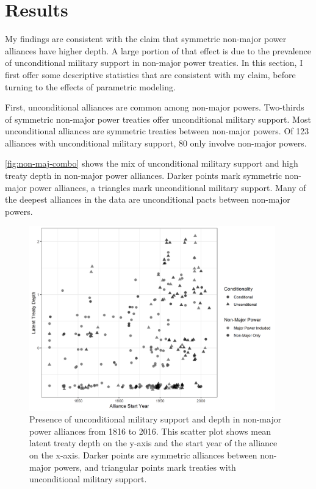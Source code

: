 \documentclass[12pt]{article}
\begin{document}
\section{Results}

My findings are consistent with the claim that symmetric non-major power alliances have higher depth. 
A large portion of that effect is due to the prevalence of unconditional military support in non-major power treaties. 
In this section, I first offer some descriptive statistics that are consistent with my claim, before turning to the effects of parametric modeling. 


First, unconditional alliances are common among non-major powers. 
Two-thirds of symmetric non-major power treaties offer unconditional military support. 
Most unconditional alliances are symmetric treaties between non-major powers. 
Of 123 alliances with unconditional military support, 80 only involve non-major powers. 


\autoref{fig:non-maj-combo} shows the mix of unconditional military support and high treaty depth in non-major power alliances. 
Darker points mark symmetric non-major power alliances, a triangles mark unconditional military support. 
Many of the deepest alliances in the data are unconditional pacts between non-major powers. 

\begin{figure}[hbtp]
\centering
\includegraphics[width=0.95\textwidth]{../figures/non-maj-combo.png}
\caption{Presence of unconditional military support and depth in non-major power alliances from 1816 to 2016. This scatter plot shows mean latent treaty depth on the y-axis and the start year of the alliance on the x-axis. Darker points are symmetric alliances between non-major powers, and triangular points mark treaties with unconditional military support.}
\label{fig:non-maj-combo}
\end{figure}
\end{document}
